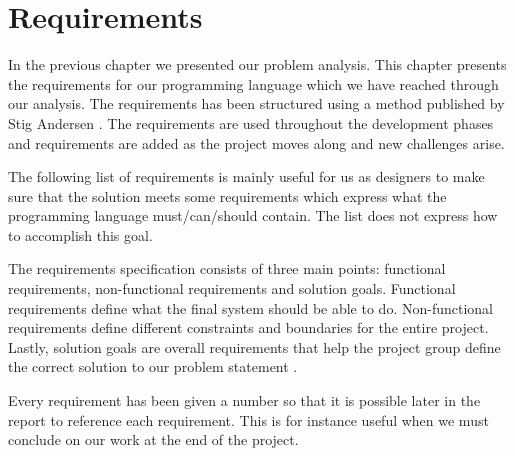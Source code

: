 \chapter{Requirements}
\label{chap:requirements}
In the previous chapter we presented our problem analysis. This chapter presents the requirements for our programming language which we have reached through our analysis. The requirements has been structured using a method published by Stig Andersen \cite{requirementsGuide}. The requirements are used throughout the development phases and requirements are added as the project moves along and new challenges arise. 


The following list of requirements is mainly useful for us as designers to make sure that the solution meets some requirements which express what the programming language must/can/should contain. The list does not express how to accomplish this goal.

The requirements specification consists of three main points: functional requirements, non-functional requirements and solution goals. Functional requirements define what the final system should be able to do. Non-functional requirements define different constraints and boundaries for the entire project. Lastly, solution goals are overall requirements that help the project group define the correct solution to our problem statement \cite{requirementsGuide}.

Every requirement has been given a number so that it is possible later in the report to reference each requirement. This is for instance useful when we must conclude on our work at the end of the project.


